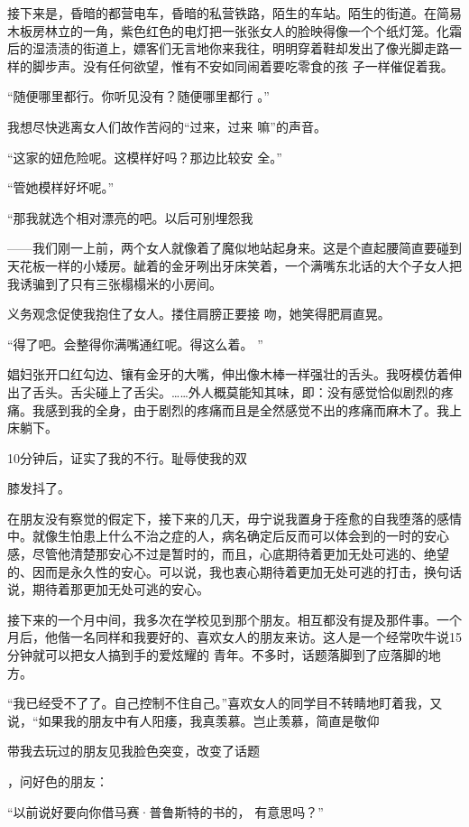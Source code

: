 \documentclass{article}
\begin{document}
接下来是，昏暗的都营电车，昏暗的私营铁路，陌生的车站。陌生的街道。在简易木板房林立的一角，紫色红色的电灯把一张张女人的脸映得像一个个纸灯笼。化霜后的湿渍渍的街道上，嫖客们无言地你来我往，明明穿着鞋却发出了像光脚走路一样的脚步声。没有任何欲望，惟有不安如同闹着要吃零食的孩
子一样催促着我。 

“随便哪里都行。你听见没有？随便哪里都行
。” 

我想尽快逃离女人们故作苦闷的“过来，过来
嘛”的声音。 

“这家的妞危险呢。这模样好吗？那边比较安
全。” 


“管她模样好坏呢。” 

\newpage

“那我就选个相对漂亮的吧。以后可别埋怨我

——我们刚一上前，两个女人就像着了魔似地站起身来。这是个直起腰简直要碰到天花板一样的小矮房。龇着的金牙咧出牙床笑着，一个满嘴东北话的大个子女人把我诱骗到了只有三张榻榻米的小房间。
 

义务观念促使我抱住了女人。搂住肩膀正要接
吻，她笑得肥肩直晃。 

“得了吧。会整得你满嘴通红呢。得这么着。
” 

娼妇张开口红勾边、镶有金牙的大嘴，伸出像木棒一样强壮的舌头。我呀模仿着伸出了舌头。舌尖碰上了舌尖。……外人概莫能知其味，即：没有感觉恰似剧烈的疼痛。我感到我的全身，由于剧烈的疼痛而且是全然感觉不出的疼痛而麻木了。我上床躺下。

10分钟后，证实了我的不行。耻辱使我的双
\newpage

膝发抖了。 

在朋友没有察觉的假定下，接下来的几天，毋宁说我置身于痊愈的自我堕落的感情中。就像生怕患上什么不治之症的人，病名确定后反而可以体会到的一时的安心感，尽管他清楚那安心不过是暂时的，而且，心底期待着更加无处可逃的、绝望的、因而是永久性的安心。可以说，我也衷心期待着更加无处可逃的打击，换句话说，期待着那更加无处可逃的安心。

接下来的一个月中间，我多次在学校见到那个朋友。相互都没有提及那件事。一个月后，他偕一名同样和我要好的、喜欢女人的朋友来访。这人是一个经常吹牛说15分钟就可以把女人搞到手的爱炫耀的
青年。不多时，话题落脚到了应落脚的地方。 

“我已经受不了了。自己控制不住自己。”喜欢女人的同学目不转睛地盯着我，又说，“如果我的朋友中有人阳痿，我真羡慕。岂止羡慕，简直是敬仰

带我去玩过的朋友见我脸色突变，改变了话题
\newpage

，问好色的朋友： 

“以前说好要向你借马赛·普鲁斯特的书的，
有意思吗？” 
\end{document}
